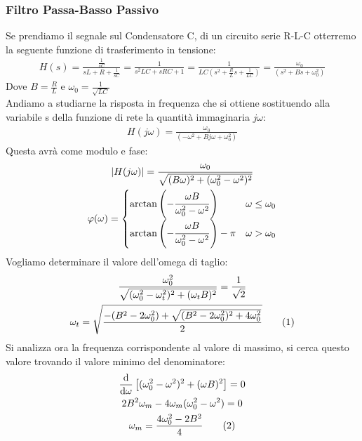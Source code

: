\documentclass{article}
\newcommand{\df}{\mathrm{d}}
\newcommand{\tageq}{\tag{\stepcounter{equation}\theequation}}
\numberwithin{equation}{subsection}
\begin{document}
\subsubsection{Filtro Passa-Basso Passivo}
Se prendiamo il segnale sul Condensatore C, di un circuito serie R-L-C otterremo la seguente funzione di trasferimento in tensione:
\begin{gather*}
    H(s)= \frac{\frac{1}{sC}}{sL+R+\frac{1}{sC}}=\frac{1}{s^2LC+sRC+1}=\frac{1}{LC(s^2+\frac{R}{L}s+\frac{1}{LC})}=\frac{\omega_0}{(s^2+Bs+\omega_0^2)}
\end{gather*}
Dove $B=\frac{R}{L}$ e $\omega_0=\frac{1}{\sqrt{LC}}$\\
Andiamo a studiarne la risposta in frequenza che si ottiene sostituendo alla variabile s della funzione di rete la quantità immaginaria $j\omega$:
\begin{gather*}
    H(j\omega)=\frac{\omega_0}{(-\omega^2+Bj\omega+\omega_0^2)}
\end{gather*}
Questa avrà come modulo e fase:
\begin{gather*}
    |H(j\omega)|=\frac{\omega_0}{\sqrt{(B\omega)^2+(\omega_0^2-\omega^2)^2}}\\
     \varphi(\omega)=\begin{cases}
        \arctan\left(\displaystyle-\frac{\strut \omega B}{\omega_0^2-\omega^2}\right)&\omega\leq\omega_0\\
        \arctan\left(\displaystyle-\frac{\strut \omega B}{\omega_0^2-\omega^2}\right)-\pi&\omega>\omega_0
    \end{cases}
\end{gather*}
Vogliamo determinare il valore dell'omega di taglio:
\begin{gather*}
    \displaystyle\frac{\omega_0^2}{\sqrt{(\omega_0^2-\omega_t^2)^2+(\omega_t B)^2}}=\frac{1}{\sqrt2}\\
    \omega_t=\displaystyle\sqrt{\frac{-(B^2-2\omega_0^2)+\sqrt{(B^2-2\omega_0^2)^2+4\omega_0^2}}{2}}\tageq
\end{gather*}
Si analizza ora la frequenza corrispondente al valore di massimo, si cerca questo valore trovando il valore minimo del denominatore:
\begin{gather*}
    \displaystyle\frac{\df}{\df\omega}\left[{{(\omega_0^2-\omega^2)^2+(\omega B)^2}}\right]=0\\
    2B^2\omega_m-4\omega_m(\omega_0^2-\omega^2)=0\\
    \omega_m=\displaystyle\frac{4\omega_0^2-2B^2}{4}\tageq
\end{gather*}
\end{document}
